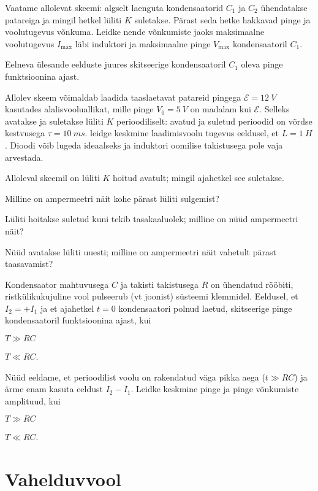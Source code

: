 \documentclass[a4paper,11pt,twocolumn]{article}
\begin{document}
\begin{question}[vv3][5cm]
    Vaatame allolevat skeemi: algselt laenguta kondensaatorid $C_1$ ja $C_2$ ühendatakse patareiga ja mingil hetkel lüliti $K$ suletakse. Pärast seda hetke hakkavad pinge ja voolutugevus võnkuma. Leidke nende võnkumiste jaoks maksimaalne voolutugevus $I_{\mathrm{max}}$ läbi induktori ja maksimaalne pinge $V_{\mathrm{max}}$ kondensaatoril $C_1$.
\end{question}

\begin{question}
    Eelneva ülesande eelduste juures skitseerige kondensaatoril $C_1$ oleva pinge funktsioonina ajast.
\end{question}

\begin{question}[vv4][6cm]
    Allolev skeem võimaldab laadida taaslaetavat patareid pingega $\mathcal{E}=\SI{12}{V}$ kasutades alalisvooluallikat, mille pinge $V_0=\SI{5}{V}$ on madalam kui $\mathcal{E}$. Selleks avatakse ja suletakse lüliti $K$ perioodiliselt: avatud ja suletud perioodid on võrdse kestvusega $\tau=\SI{10}{ms}$. leidge keskmine laadimisvoolu tugevus eeldusel, et $L=\SI{1}{H}$. Dioodi võib lugeda ideaalseks ja induktori oomilise takistusega pole vaja arvestada.
\end{question}

\begin{question}[vv5][6cm]
    Alloleval skeemil on lüliti $K$ hoitud avatult; mingil ajahetkel see suletakse.
    \begin{subquestion}
    \item Milline on ampermeetri näit kohe pärast lüliti sulgemist?
    \item Lüliti hoitakse suletud kuni tekib tasakaaluolek; milline on nüüd ampermeetri näit?
    \item Nüüd avatakse lüliti uuesti; milline on ampermeetri näit vahetult pärast taasavamist?
    \end{subquestion}
\end{question}

\begin{question}[vv6][6cm]
    Kondensaator mahtuvusega $C$ ja takisti takistusega $R$ on ühendatud rööbiti, ristkülikukujuline vool pulseerub (vt joonist) süsteemi klemmidel. Eeldusel, et $I_2=+I_1$ ja et ajahetkel $t=0$ kondensaatori polnud laetud, skitseerige pinge kondensaatoril funktsioonina ajast, kui
    \begin{subquestion}
    \item $T\gg RC$
    \item $T\ll RC$.
    \end{subquestion}
    \vspace{-1em}
    Nüüd eeldame, et perioodilist voolu on rakendatud väga pikka aega ($t\gg RC$) ja ärme enam kasuta eeldust $I_2-I_1$. Leidke keskmine pinge ja pinge võnkumiste amplituud, kui
    \begin{subquestion}%
    \item $T\gg RC$
    \item $T\ll RC$.
    \end{subquestion}
\end{question}

\section{Vahelduvvool}
\end{document}
